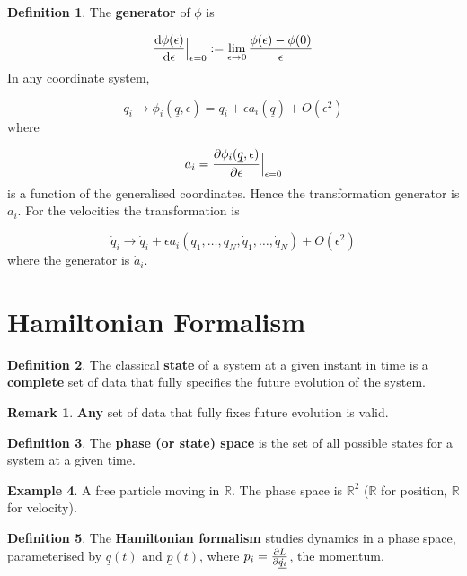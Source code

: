 \documentclass[12pt,a4paper]{article}
\theoremstyle{definition}
\newtheorem{definition}{Definition}[subsection]
\newtheorem{example}[definition]{Example}
\newtheorem*{remark}{Remark}
\begin{document}
\begin{definition}
	The \textbf{generator} of $\phi$ is

	\[ \diff{\phi(\epsilon)}{\epsilon} \Big|_{\epsilon = 0} := \lim_{\epsilon \rightarrow 0} \frac{\phi(\epsilon) - \phi(0)}{\epsilon} \]
	In any coordinate system,

	\[ q_i \rightarrow \phi_i(\underline{q}, \epsilon) = q_i + \epsilon a_i(\underline{q}) + O(\epsilon^2) \]
	where

	\[ a_i = \diffp{\phi_i(\underline{q}, \epsilon)}{\epsilon} \Big|_{\epsilon = 0} \]
	is a function of the generalised coordinates. Hence the transformation generator is $a_i$. For the velocities the transformation is

	\[ \dot{q}_i \rightarrow \dot{q}_i + \epsilon a_i(q_1, \dots, q_N, \dot{q}_1, \dots, \dot{q}_N) + O(\epsilon^2) \]
	where the generator is $\dot{a}_i$.
\end{definition}

\section{Hamiltonian Formalism}

\begin{definition}
	The classical \textbf{state} of a system at a given instant in time is a \textbf{complete} set of data that fully specifies the future evolution of the system.
\end{definition}

\begin{remark}
	\textbf{Any} set of data that fully fixes future evolution is valid.
\end{remark}

\begin{definition}
	The \textbf{phase (or state) space} is the set of all possible states for a system at a given time.
\end{definition}

\begin{example}
	A free particle moving in $\mathbb{R}$. The phase space is $\mathbb{R}^2$ ($\mathbb{R}$ for position, $\mathbb{R}$ for velocity).
\end{example}

\begin{definition}
	The \textbf{Hamiltonian formalism} studies dynamics in a phase space, parameterised by $\underline{q}(t)$ and $\underline{p}(t)$, where $p_i = \diffp{L}{\dot{\underline{q_i}}}$, the momentum.
\end{definition}
\end{document}
